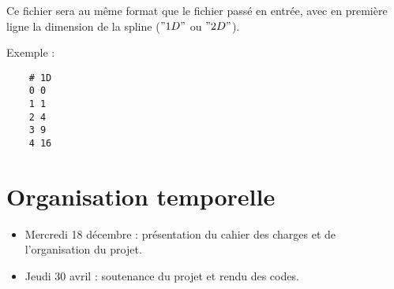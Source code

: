 \documentclass[a4paper,12pt]{article}
\begin{document}
Ce fichier sera au même format que le fichier passé en entrée, avec en première ligne la dimension de la spline ($"1D" $ ou $"2D"$).

Exemple : 

\begin{lstlisting}
    # 1D
    0 0
    1 1
    2 4
    3 9
    4 16
\end{lstlisting}

\section{Organisation temporelle}
\begin{itemize}
\item Mercredi 18 décembre : présentation du cahier des charges et de l'organisation du projet.
\item Jeudi 30 avril : soutenance du projet et rendu des codes.
\end{itemize}
\end{document}
